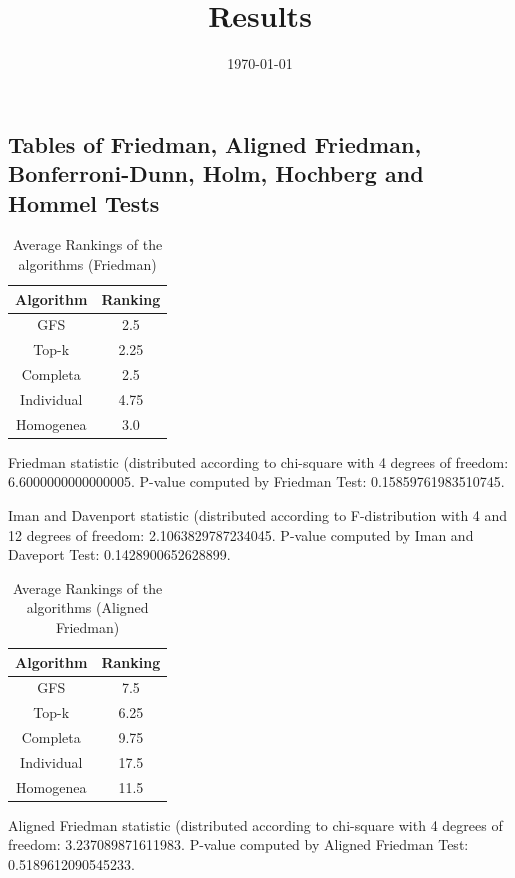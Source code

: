 \documentclass[a4paper,10pt]{article}
\title{Results}
\author{}
\date{\today}
\begin{document}
\begin{landscape}
\oddsidemargin 0in \topmargin 0in\maketitle
\section{Tables of Friedman, Aligned Friedman, Bonferroni-Dunn, Holm, Hochberg and Hommel Tests}
\begin{table}[!htp]
\centering
\caption{Average Rankings of the algorithms (Friedman)
}\begin{tabular}{c|c}
Algorithm&Ranking\\
\hline
GFS&2.5\\
Top-k&2.25\\
Completa&2.5\\
Individual&4.75\\
Homogenea&3.0\\
\end{tabular}
\end{table}


Friedman statistic (distributed according to chi-square with 4 degrees of freedom: 6.6000000000000005. 
P-value computed by Friedman Test: 0.15859761983510745.\newline

Iman and Davenport statistic (distributed according to F-distribution with 4 and 12 degrees of freedom: 2.1063829787234045. 
P-value computed by Iman and Daveport Test: 0.1428900652628899.\newline


\newpage

\begin{table}[!htp]
\centering
\caption{Average Rankings of the algorithms (Aligned Friedman)
}\begin{tabular}{c|c}
Algorithm&Ranking\\
\hline
GFS&7.5\\
Top-k&6.25\\
Completa&9.75\\
Individual&17.5\\
Homogenea&11.5\\
\end{tabular}
\end{table}


Aligned Friedman statistic (distributed according to chi-square with 4 degrees of freedom: 3.237089871611983. 
P-value computed by Aligned Friedman Test: 0.5189612090545233.\newline



\end{landscape}
\end{document}
